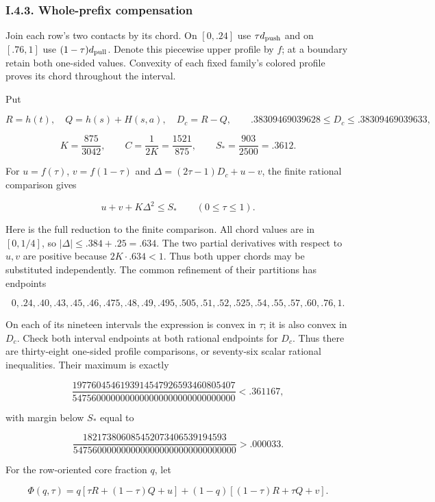 \hypertarget{af-a9ec399514-i.4.3.-whole-prefix-compensation}{%
\subsubsection{I.4.3. Whole-prefix compensation}\label{af-a9ec399514-i.4.3.-whole-prefix-compensation}}

Join each row's two contacts by its chord. On \([0,.24]\) use \(\tau d_{\rm push}\) and on \([.76,1]\) use \((1-\tau)d_{\rm pull}\). Denote this piecewise upper profile by \(f\); at a boundary retain both one-sided values. Convexity of each fixed family's colored profile proves its chord throughout the interval.

Put

\[
R=h(t),\quad Q=h(s)+H(s,a),\quad D_c=R-Q,
\qquad .38309469039628\le D_c\le .38309469039633,
\]

\[
K=\frac{875}{3042},\qquad C=\frac1{2K}=\frac{1521}{875},
\qquad S_*=\frac{903}{2500}=.3612.
\tag{122}
\]

For \(u=f(\tau)\), \(v=f(1-\tau)\) and \(\Delta=(2\tau-1)D_c+u-v\), the finite rational comparison gives

\[
u+v+K\Delta^2\le S_*\qquad(0\le\tau\le1).
\tag{123}
\]

Here is the full reduction to the finite comparison. All chord values are in \([0,1/4]\), so \(|\Delta|\le .384+.25=.634\). The two partial derivatives with respect to \(u,v\) are positive because \(2K\cdot .634<1\). Thus both upper chords may be substituted independently. The common refinement of their partitions has endpoints

\[
0,.24,.40,.43,.45,.46,.475,.48,.49,.495,
.505,.51,.52,.525,.54,.55,.57,.60,.76,1.
\tag{124}
\]

On each of its nineteen intervals the expression is convex in \(\tau\); it is also convex in \(D_c\). Check both interval endpoints at both rational endpoints for \(D_c\). Thus there are thirty-eight one-sided profile comparisons, or seventy-six scalar rational inequalities. Their maximum is exactly

\[
\frac{1977604546193914547926593460805407}
{5475600000000000000000000000000000}<.361167,
\]

with margin below \(S_*\) equal to

\[
\frac{182173806085452073406539194593}
{5475600000000000000000000000000000}>.000033.
\tag{125}
\]

For the row-oriented core fraction \(q\), let

\[
\Phi(q,\tau)=q[\tau R+(1-\tau)Q+u]
 +(1-q)[(1-\tau)R+\tau Q+v].
\]

